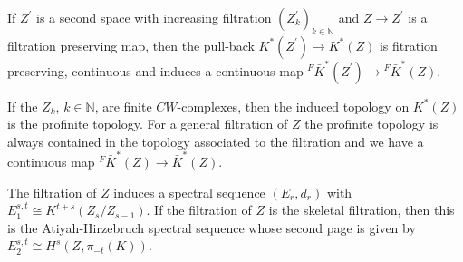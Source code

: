 \documentclass[12pt]{article}
\newcommand{\Gr}{\mathrm{Gr}}
\newcommand{\hocolim}{{\tt hocolim}}
\renewcommand{\ker}{{\tt ker}}
\newcommand{\nat}{{\mathbb{N}}}
\begin{document}
If $Z^{\prime}$ is a second space with  increasing filtration $(Z^{\prime}_{k})_{k\in \nat}$ and $Z\to Z^{\prime}$ is a filtration preserving map, then the pull-back
$ K^{*}(Z^{\prime})\to K^{*}(Z)$ is fitration preserving, continuous and induces a continuous map
${}^{F}\bar K^{*}(Z^{\prime})\to {}^{F}\bar K^{*}(Z)$.

  If the $Z_{k}$, $k\in \nat$, are finite $CW$-complexes, then the induced topology on $K^{*}(Z)$  is   the profinite topology.  
For a general filtration of $Z$ the profinite topology is always contained in the topology
associated to the filtration and we have a continuous map ${}^{F}\bar K^{*}(Z)\to \bar K^{*}(Z)$.






The filtration of $Z$ induces a spectral sequence
$(E_{r},d_{r})$ with $E_{1}^{s,t}\cong  K^{t+s}(Z_{s}/Z_{s-1})$.
If the filtration of $Z$ is the skeletal filtration, then this is the Atiyah-Hirzebruch spectral sequence whose second page is given by $E_{2}^{s,t}\cong H^{s}(Z,\pi_{-t}(K))$.
\end{document}
